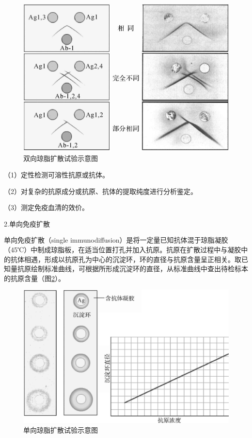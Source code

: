 \begin{figure}[!htbp]
 \centering
 \includegraphics{./images/Image00159.jpg}
 \captionsetup{justification=centering}
 \caption{双向琼脂扩散试验示意图}
 \label{fig10-7}
  \end{figure} 

（1）定性检测可溶性抗原或抗体。

（2）对复杂的抗原成分或抗原、抗体的提取纯度进行分析鉴定。

（3）测定免疫血清的效价。

2.单向免疫扩散

单向免疫扩散（single
immunodiffusion）是将一定量已知抗体混于琼脂凝胶（45℃）中制成琼脂板，在适当位置打孔并加入抗原。抗原在扩散过程中与凝胶中的抗体相遇，形成以抗原孔为中心的沉淀环，环的直径与抗原含量呈正相关。取已知量抗原绘制标准曲线，可根据所形成沉淀环的直径，从标准曲线中查出待检标本的抗原含量（图\ref{fig10-8}）。

\begin{figure}[!htbp]
 \centering
 \includegraphics{./images/Image00160.jpg}
 \captionsetup{justification=centering}
 \caption{单向琼脂扩散试验示意图}
 \label{fig10-8}
  \end{figure} 

